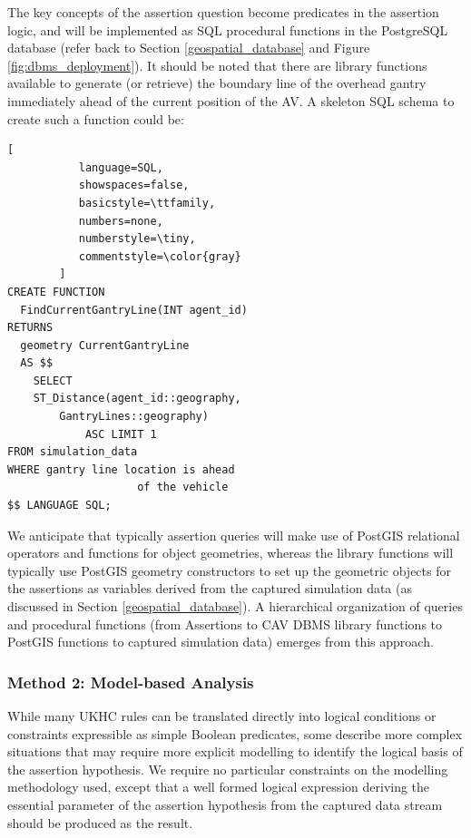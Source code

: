 \begin{itemize}
The key concepts of the assertion question become predicates in the assertion logic, and will be implemented as SQL procedural functions in the PostgreSQL database (refer back to Section \ref{geospatial_database} and Figure \ref{fig:dbms_deployment}). It should be noted that there are library functions available to generate (or retrieve) the boundary line of the overhead gantry immediately ahead of the current position of the AV. A skeleton SQL schema to create such a function could be: 

    \begin{lstlisting}[
           language=SQL,
           showspaces=false,
           basicstyle=\ttfamily,
           numbers=none,
           numberstyle=\tiny,
           commentstyle=\color{gray}
        ]
CREATE FUNCTION
  FindCurrentGantryLine(INT agent_id) 
RETURNS 
  geometry CurrentGantryLine
  AS $$
    SELECT 
    ST_Distance(agent_id::geography, 
        GantryLines::geography)
            ASC LIMIT 1
FROM simulation_data
WHERE gantry line location is ahead 
                    of the vehicle
$$ LANGUAGE SQL;
\end{lstlisting}
    We anticipate that typically assertion queries will make use of PostGIS relational operators and functions for object geometries, whereas the library functions will typically use PostGIS geometry constructors to set up the geometric objects for the assertions as variables derived from the captured simulation data (as discussed in Section \ref{geospatial_database}). A hierarchical organization of queries and procedural functions (from Assertions to CAV DBMS library functions to PostGIS functions to captured simulation data) emerges from this approach.
\end{itemize}


\subsubsection{Method 2: Model-based Analysis} \label{model_based_analysis}

While many UKHC rules can be translated directly into logical conditions or constraints expressible as simple Boolean predicates, some describe more complex situations that may require more explicit modelling to identify the logical basis of the assertion hypothesis. We require no particular constraints on the modelling methodology used, except that a well formed logical expression deriving the essential parameter of the assertion hypothesis from the captured data stream should be produced as the result.

